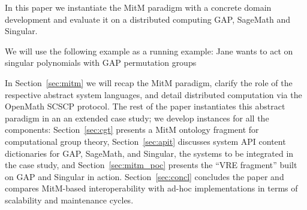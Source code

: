 In this paper we instantiate the MitM paradigm with a concrete domain development and evaluate it on a distributed computing GAP, SageMath and Singular.

We will use the following example as a running example: Jane wants to act on singular polynomials with GAP permutation groups

In Section~\ref{sec:mitm} we will recap the MitM paradigm, clarify the role of the respective abstract system languages, and  detail distributed computation via the OpenMath SCSCP protocol.
The rest of the paper instantiates this abstract paradigm in an an extended case study; we develop instances for all the components: Section~\ref{sec:cgt} presents a MitM ontology fragment for computational group theory, Section~\ref{sec:apit} discusses system API content dictionaries for GAP, SageMath, and Singular, the systems to be integrated in the case study, and Section~\ref{sec:mitm_poc} presents the ``VRE fragment'' built on GAP and Singular in action. 
Section~\ref{sec:concl} concludes the paper and compares MitM-based interoperability with ad-hoc implementations in terms of scalability and maintenance cycles. 


